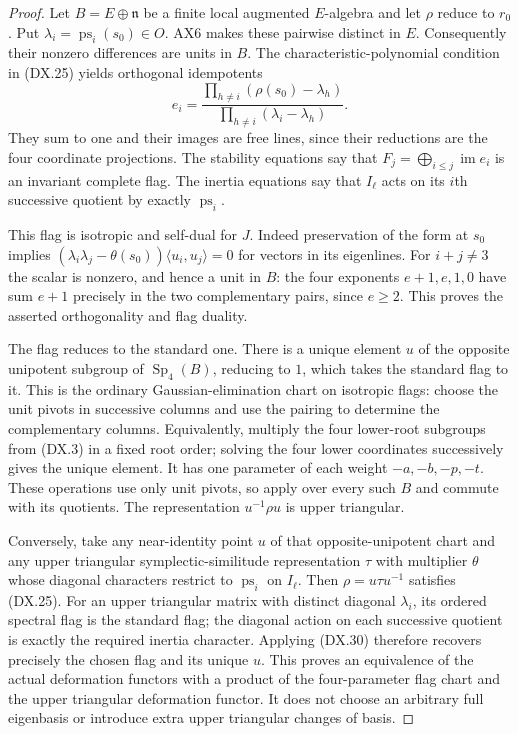 \begin{proof}
Let $B=E\oplus\mathfrak n$ be a finite local augmented
$E$-algebra and let $\rho$ reduce to $r_0$.
Put $\lambda_i=\operatorname{ps}_i(s_0)\in O$.
AX6 makes these pairwise distinct in $E$.
Consequently their nonzero differences are units in $B$.
The characteristic-polynomial condition in (DX.25) yields
orthogonal idempotents
\[
 e_i=
 \frac{\prod_{h\ne i}(\rho(s_0)-\lambda_h)}
                 {\prod_{h\ne i}(\lambda_i-\lambda_h)}.
 \tag{DX.30}
\]
They sum to one and their images are free lines, since
their reductions are the four coordinate projections.
The stability equations say that
$F_j=\bigoplus_{i\le j}\operatorname{im}e_i$ is an invariant
complete flag.  The inertia equations say that $I_\ell$
acts on its $i$th successive quotient by exactly
$\operatorname{ps}_i$.

This flag is isotropic and self-dual for $J$.
Indeed preservation of the form at $s_0$ implies
$(\lambda_i\lambda_j-\theta(s_0))\langle u_i,u_j\rangle=0$
for vectors in its eigenlines.
For $i+j\ne3$ the scalar is nonzero, and hence a unit in $B$:
the four exponents $e+1,e,1,0$ have sum $e+1$ precisely
in the two complementary pairs, since $e\ge2$.
This proves the asserted orthogonality and flag duality.

The flag reduces to the standard one.
There is a unique element $u$ of the opposite unipotent
subgroup of $\operatorname{Sp}_4(B)$, reducing to $1$,
which takes the standard flag to it.
This is the ordinary Gaussian-elimination chart on isotropic
flags: choose the unit pivots in successive columns and use
the pairing to determine the complementary columns.
Equivalently, multiply the four lower-root subgroups from
(DX.3) in a fixed root order; solving the four lower
coordinates successively gives the unique element.
It has one parameter of each weight $-a,-b,-p,-t$.
These operations use only unit pivots, so apply over every
such $B$ and commute with its quotients.
The representation $u^{-1}\rho u$ is upper triangular.

Conversely, take any near-identity point $u$ of that
opposite-unipotent chart and any upper triangular
symplectic-similitude representation $\tau$ with multiplier
$\theta$ whose diagonal characters restrict to
$\operatorname{ps}_i$ on $I_\ell$.
Then $\rho=u\tau u^{-1}$ satisfies (DX.25).
For an upper triangular matrix with distinct diagonal
$\lambda_i$, its ordered spectral flag is the standard flag;
the diagonal action on each successive quotient is exactly
the required inertia character.  Applying (DX.30) therefore
recovers precisely the chosen flag and its unique $u$.
This proves an equivalence of the actual deformation
functors with a product of the four-parameter flag chart
and the upper triangular deformation functor.
It does not choose an arbitrary full eigenbasis or introduce
extra upper triangular changes of basis.


\end{proof}
